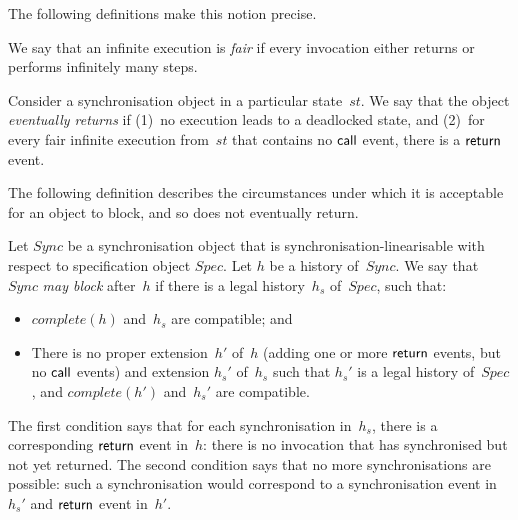 The following definitions make this notion precise.
%
\begin{definition}
We say that an infinite execution is \emph{fair} if every invocation either
returns or performs infinitely many steps.

Consider a synchronisation object in a particular state~$st$.  We say that the
object \emph{eventually returns} if (1)~no execution leads to a deadlocked
state, and (2)~for every fair infinite execution
from~$st$ that contains no $\mathsf{call}$ event, there is a $\mathsf{return}$ event.
\end{definition}
%






The following definition describes the circumstances under which it is
acceptable for an object to block, and so does not eventually return.
%
\begin{definition}
\label{def:may-block}
Let $Sync$ be a synchronisation object that is synchronisation-linearisable
with respect to specification object $Spec$.  Let $h$ be a history of~$Sync$.
We say that $Sync$ \emph{may block} after~$h$ if there is a legal
history~$h_s$ of~$Spec$, such that:
%
\begin{itemize}
\item $complete(h)$ and~$h_s$ are compatible; and

\item There is no proper extension~$h'$ of~$h$ (adding one or more $\mathsf{return}$
  events, but no $\mathsf{call}$ events) and extension $h_s'$ of~$h_s$ such that
  $h_s'$ is a legal history of~$Spec$, and $complete(h')$ and~$h_s'$ are
  compatible.
\end{itemize}
\end{definition}
%
The first condition says that for each synchronisation in~$h_s$,
there is a corresponding $\mathsf{return}$ event in~$h$: there is no invocation that
has synchronised but not yet returned.  The second condition says that no more
synchronisations are possible: such a synchronisation would correspond to a
synchronisation event in~$h_s'$ and $\mathsf{return}$ event in~$h'$.

